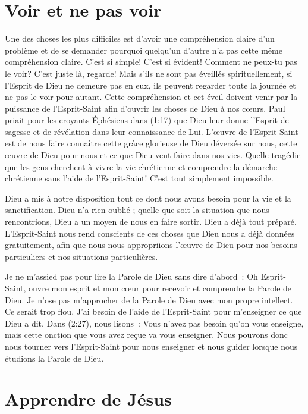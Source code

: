 \section*{Voir et ne pas voir}

Une des choses les plus difficiles est d'avoir une compréhension
 claire d'un problème et de se demander pourquoi quelqu'un d'autre
 n'a pas cette même compréhension claire. C'est si simple!
 C'est si évident! Comment ne peux-tu pas le voir?
 C'est juste là, regarde! Mais s'ils ne sont pas éveillés spirituellement,
 si l'Esprit de Dieu ne demeure pas en eux, ils peuvent regarder
 toute la journée et ne pas le voir pour autant.
 Cette compréhension et cet éveil doivent venir par la puissance
 de l'Esprit-Saint afin d'ouvrir les choses de Dieu à nos cœurs.
 Paul priait pour les croyants Éphésiens dans (1:17)
 que Dieu leur donne l'Esprit de sagesse et de révélation dans leur
 connaissance de Lui. L'œuvre de l'Esprit-Saint est de nous faire
 connaître cette grâce glorieuse de Dieu déversée sur nous,
 cette œuvre de Dieu pour nous et ce que Dieu veut faire dans nos vies.
 Quelle tragédie que les gens cherchent à vivre la vie chrétienne
 et comprendre la démarche chrétienne sans l'aide de l'Esprit-Saint!
 C'est tout simplement impossible.

Dieu a mis à notre disposition tout ce dont nous avons besoin pour la vie
 et la sanctification. Dieu n'a rien oublié ; quelle que soit la situation
 que nous rencontrions, Dieu a un moyen de nous en faire sortir.
 Dieu a déjà tout préparé. L'Esprit-Saint nous rend conscients
 de ces choses que Dieu nous a déjà données gratuitement,
 afin que nous nous appropriions l'œuvre de Dieu pour nos besoins
 particuliers et nos situations particulières.

Je ne m'assied pas pour lire la Parole de Dieu sans dire d'abord~:
 \og Oh Esprit-Saint, ouvre mon esprit et mon cœur pour recevoir
 et comprendre la Parole de Dieu. \fg{}
 Je n'ose pas m'approcher de la Parole de Dieu avec mon propre intellect.
 Ce serait trop flou. J'ai besoin de l'aide de l'Esprit-Saint
 pour m'enseigner ce que Dieu a dit.
 Dans (2:27), nous lisons~:
 \og Vous n'avez pas besoin qu'on vous enseigne, mais cette onction
 que vous avez reçue va vous enseigner. \fg{}
 Nous pouvons donc nous tourner vers l'Esprit-Saint
 pour nous enseigner et nous guider lorsque nous étudions
 la Parole de Dieu.


\section*{Apprendre de Jésus}


